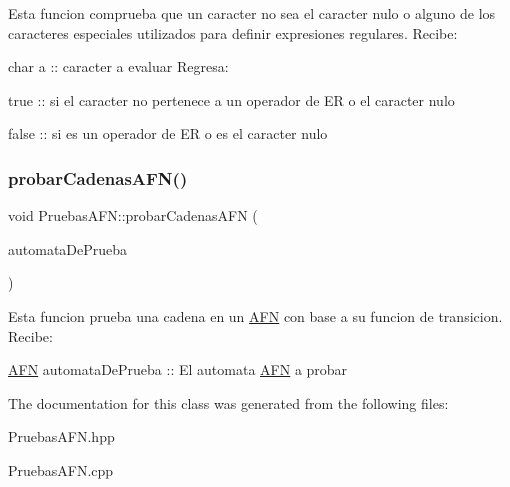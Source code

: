 Esta funcion comprueba que un caracter no sea el caracter nulo o alguno de los caracteres especiales utilizados para definir expresiones regulares. Recibe\+:
\begin{DoxyItemize}
\item char a \+:\+: caracter a evaluar Regresa\+:
\item true \+:\+: si el caracter no pertenece a un operador de ER o el caracter nulo
\item false \+:\+: si es un operador de ER o es el caracter nulo 
\end{DoxyItemize}\mbox{\label{class_pruebas_a_f_n_a9349654408b4c931fd854f8cd304d324}} 
\subsubsection{\texorpdfstring{probar\+Cadenas\+A\+F\+N()}{probarCadenasAFN()}}
{\footnotesize\ttfamily void Pruebas\+A\+F\+N\+::probar\+Cadenas\+A\+FN (\begin{DoxyParamCaption}\item[{\hyperlink{class_a_f_n}{A\+FN}}]{automata\+De\+Prueba }\end{DoxyParamCaption})}

Esta funcion prueba una cadena en un \hyperlink{class_a_f_n}{A\+FN} con base a su funcion de transicion. Recibe\+:
\begin{DoxyItemize}
\item \hyperlink{class_a_f_n}{A\+FN} automata\+De\+Prueba \+:\+: El automata \hyperlink{class_a_f_n}{A\+FN} a probar 
\end{DoxyItemize}

The documentation for this class was generated from the following files\+:\begin{DoxyCompactItemize}
\item 
Pruebas\+A\+F\+N.\+hpp\item 
Pruebas\+A\+F\+N.\+cpp\end{DoxyCompactItemize}
